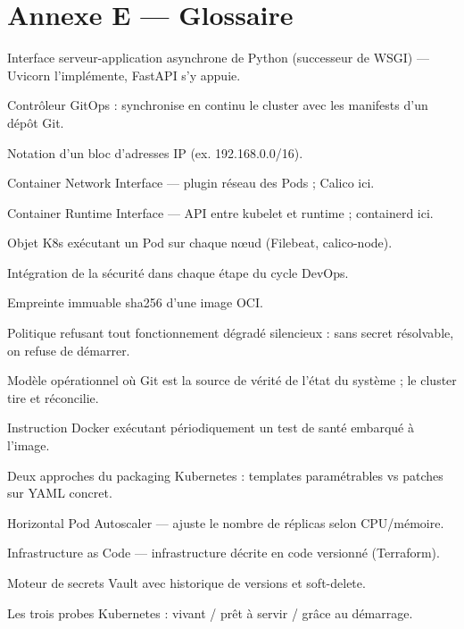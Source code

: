 \documentclass[12pt,a4paper]{article}
\begin{document}
\section*{Annexe E --- Glossaire}

\begin{description}[itemsep=2pt,leftmargin=1.6em]
  \item[ASGI] Interface serveur-application asynchrone de Python (successeur de WSGI) --- Uvicorn l'implémente, FastAPI s'y appuie.
  \item[ArgoCD] Contrôleur GitOps : synchronise en continu le cluster avec les manifests d'un dépôt Git.
  \item[CIDR] Notation d'un bloc d'adresses IP (ex. 192.168.0.0/16).
  \item[CNI] Container Network Interface --- plugin réseau des Pods ; Calico ici.
  \item[CRI] Container Runtime Interface --- API entre kubelet et runtime ; containerd ici.
  \item[DaemonSet] Objet K8s exécutant un Pod sur chaque nœud (Filebeat, calico-node).
  \item[DevSecOps] Intégration de la sécurité dans chaque étape du cycle DevOps.
  \item[Digest] Empreinte immuable sha256 d'une image OCI.
  \item[fail-closed] Politique refusant tout fonctionnement dégradé silencieux : sans secret résolvable, on refuse de démarrer.
  \item[GitOps] Modèle opérationnel où Git est la source de vérité de l'état du système ; le cluster tire et réconcilie.
  \item[HEALTHCHECK] Instruction Docker exécutant périodiquement un test de santé embarqué à l'image.
  \item[Helm/Kustomize] Deux approches du packaging Kubernetes : templates paramétrables vs patches sur YAML concret.
  \item[HPA] Horizontal Pod Autoscaler --- ajuste le nombre de réplicas selon CPU/mémoire.
  \item[IaC] Infrastructure as Code --- infrastructure décrite en code versionné (Terraform).
  \item[KV-v2] Moteur de secrets Vault avec historique de versions et soft-delete.
  \item[liveness/readiness/startup] Les trois probes Kubernetes : vivant / prêt à servir / grâce au démarrage.

\end{description}
\end{document}
